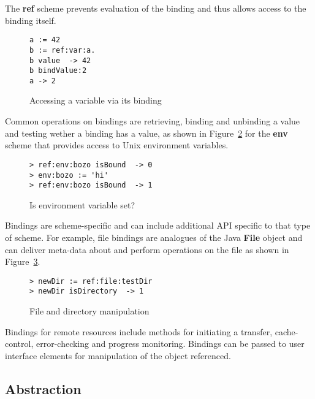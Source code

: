\documentclass[preprint,authoryear]{acm_proc_article-sp}
\begin{document}
The {\bf ref} scheme prevents evaluation of the binding and thus allows access
to the binding itself.  

\begin{figure}[htbp]
\begin{center}
\begin{verbatim}
a := 42
b := ref:var:a.
b value  -> 42
b bindValue:2
a -> 2
\end{verbatim}
\caption{Accessing a variable via its binding}
\label{ref-binding}
\end{center}
\end{figure}

Common operations on bindings are retrieving, binding and unbinding a value and testing 
wether a binding has a value, as shown in Figure~\ref{isBound} for the {\bf env} scheme
that provides access to Unix environment variables.

\begin{figure}[htbp]
\begin{center}
\begin{verbatim}
> ref:env:bozo isBound  -> 0
> env:bozo := 'hi'
> ref:env:bozo isBound  -> 1
\end{verbatim}
\caption{Is environment variable set?}
\label{isBound}
\end{center}
\end{figure}

Bindings are scheme-specific and can include additional API specific to that type of scheme.
For example, file bindings are analogues of the Java {\bf File} object and can deliver
meta-data about and perform operations on the file as shown in Figure~\ref{ref-file-dir}.

\begin{figure}[h]
\begin{center}
\begin{verbatim}
> newDir := ref:file:testDir 
> newDir isDirectory  -> 1
\end{verbatim}
\caption{File and directory manipulation}
\label{ref-file-dir}
\end{center}
\end{figure}



Bindings for remote resources include methods for initiating a transfer, cache-control,
error-checking and progress monitoring.   Bindings can be passed to user interface
elements for manipulation of the object referenced.


\subsection{Abstraction}
\end{document}
